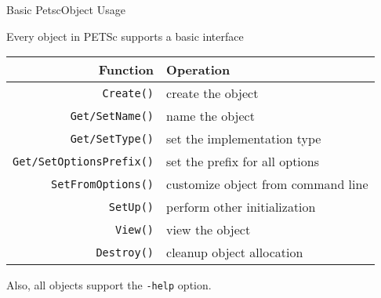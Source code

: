 \begin{frame}{Basic PetscObject Usage}

\begin{block}{Every object in PETSc supports a basic interface}
\vspace{0.3cm}
\begin{tabular}{|r|l|}
\hline
Function & Operation \\
\hline
\texttt{Create()}               & create the object \\
\texttt{Get/SetName()}          & name the object \\
\texttt{Get/SetType()}          & set the implementation type \\
\texttt{Get/SetOptionsPrefix()} & set the prefix for all options \\
\texttt{SetFromOptions()}       & customize object from command line \\
\texttt{SetUp()}                & perform other initialization \\
\texttt{View()}                 & view the object \\
\texttt{Destroy()}              & cleanup object allocation \\
\hline
\end{tabular}

\end{block}

\begin{block}{Also, all objects support the \lstinline|-help| option.}\end{block}

\end{frame}

